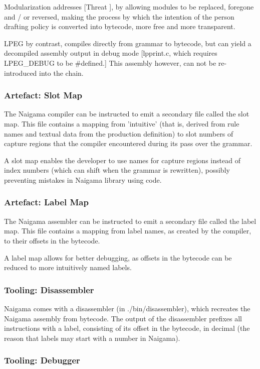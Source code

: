 Modularization addresses [Threat \thethreatbcerror], by allowing modules
to be replaced, foregone and / or reversed, making the process by which
the intention of the person drafting policy is converted into bytecode,
more free and more transparent.

LPEG \cite{bib:lpeg} by contrast, compiles directly from grammar to bytecode,
but can yield a decompiled assembly output in debug mode
[lpprint.c, which requires LPEG\_DEBUG to be \#defined.] This assembly
however, can not be re-introduced into the chain.

\subsubsection{Artefact: Slot Map}
The Naigama compiler can be instructed to emit a secondary file called
the slot map. This file contains a mapping from 'intuitive' (that is,
derived from rule names and textual data from the production definition)
to slot numbers of capture regions that the
compiler encountered during its pass over the grammar.

A slot map enables the developer to use names for capture regions instead
of index numbers (which can shift when the grammar is rewritten), possibly
preventing mistakes in Naigama library using code.

\subsubsection{Artefact: Label Map}
The Naigama assembler can be instructed to emit a secondary file called
the label map. This file contains a mapping from label names, as created
by the compiler, to their offsets in the bytecode.

A label map allows for better debugging, as offsets in the bytecode
can be reduced to more intuitively named labels.

\subsubsection{Tooling: Disassembler}

Naigama comes with a disassembler (in ./bin/disassembler), which recreates
the Naigama assembly from bytecode. The output of the disassembler prefixes
all instructions with a label, consisting of its offset in the bytecode,
in decimal (the reason that labels may start with a number in Naigama).

\subsubsection{Tooling: Debugger}

